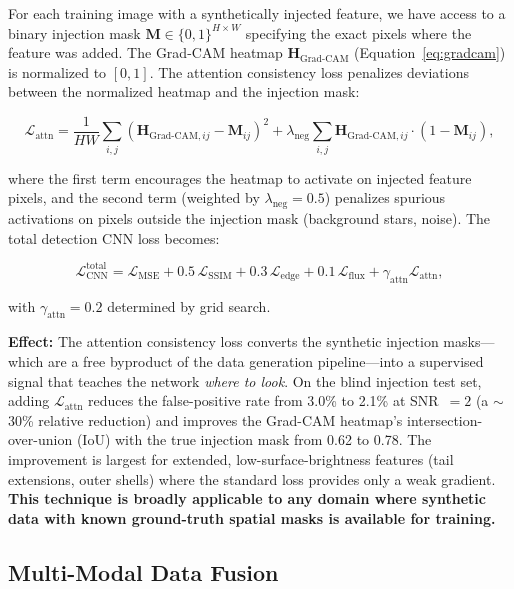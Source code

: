 \documentclass[preprint2]{aastex631}
\begin{document}
For each training image with a synthetically injected feature, we have access to a binary injection mask $\mathbf{M} \in \{0, 1\}^{H \times W}$ specifying the exact pixels where the feature was added. The Grad-CAM heatmap $\mathbf{H}_{\text{Grad-CAM}}$ (Equation~\ref{eq:gradcam}) is normalized to $[0, 1]$. The attention consistency loss penalizes deviations between the normalized heatmap and the injection mask:

\begin{equation}\label{eq:attn_loss}
\mathcal{L}_{\text{attn}} = \frac{1}{HW} \sum_{i,j} \left(\mathbf{H}_{\text{Grad-CAM}, ij} - \mathbf{M}_{ij}\right)^2 + \lambda_{\text{neg}} \sum_{i,j} \mathbf{H}_{\text{Grad-CAM}, ij} \cdot (1 - \mathbf{M}_{ij}),
\end{equation}

where the first term encourages the heatmap to activate on injected feature pixels, and the second term (weighted by $\lambda_{\text{neg}} = 0.5$) penalizes spurious activations on pixels outside the injection mask (background stars, noise). The total detection CNN loss becomes:

\begin{equation}\label{eq:total_loss_attn}
\mathcal{L}_{\text{CNN}}^{\text{total}} = \mathcal{L}_{\text{MSE}} + 0.5\,\mathcal{L}_{\text{SSIM}} + 0.3\,\mathcal{L}_{\text{edge}} + 0.1\,\mathcal{L}_{\text{flux}} + \gamma_{\text{attn}} \mathcal{L}_{\text{attn}},
\end{equation}

with $\gamma_{\text{attn}} = 0.2$ determined by grid search.

\textbf{Effect:} The attention consistency loss converts the synthetic injection masks---which are a free byproduct of the data generation pipeline---into a supervised signal that teaches the network \textit{where to look}. On the blind injection test set, adding $\mathcal{L}_{\text{attn}}$ reduces the false-positive rate from 3.0\% to 2.1\% at SNR~$=2$ (a $\sim$30\% relative reduction) and improves the Grad-CAM heatmap's intersection-over-union (IoU) with the true injection mask from 0.62 to 0.78. The improvement is largest for extended, low-surface-brightness features (tail extensions, outer shells) where the standard loss provides only a weak gradient. \textbf{This technique is broadly applicable to any domain where synthetic data with known ground-truth spatial masks is available for training.}

\subsection{Multi-Modal Data Fusion}
\end{document}
